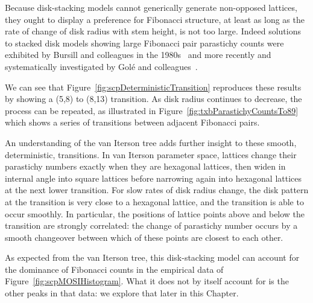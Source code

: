Because disk-stacking models cannot generically generate non-opposed lattices, they ought to display a preference for Fibonacci structure, at least as long as the rate of change of disk radius with stem height,  is not too large.
Indeed solutions to stacked disk models showing large Fibonacci pair parastichy counts were exhibited by Bursill and colleagues in the 1980s~\cite{bursillSpiralLatticeConcepts1987,xudongPackingEqualDiscs1989} and more recently and systematically investigated by Gol\'e and colleagues~\cite{goleFibonacciQuasisymmetricPhyllotaxis2016}.

 We can see that Figure~\ref{fig:scpDeterministicTransition} reproduces these results by showing a (5,8) to (8,13) transition.
As disk radius continues to decrease, the process can be repeated, as illustrated in  Figure~\ref{fig:txbParastichyCountsTo89} which shows a series of transitions between adjacent Fibonacci pairs.  
%
\clearpage
{}
%


An understanding of the van Iterson tree adds further insight to these smooth, deterministic, transitions. In van Iterson parameter space, lattices change their parastichy numbers exactly when they are hexagonal lattices, then widen in internal angle into square lattices before narrowing again into hexagonal lattices at the next lower transition.  For slow rates of disk radius change, the disk pattern at the transition is very close to a hexagonal lattice, and the transition is able to occur smoothly. In particular, the positions of lattice points above and below the transition are strongly correlated: the change of parastichy number occurs by a smooth changeover between which of these points are closest to each other. 


As expected from the van Iterson tree, this disk-stacking model can account for the dominance of Fibonacci counts in the empirical data of Figure~\ref{fig:scpMOSIHistogram}.  What it does not by itself account for is the other peaks in that data: we explore that later in this Chapter.

